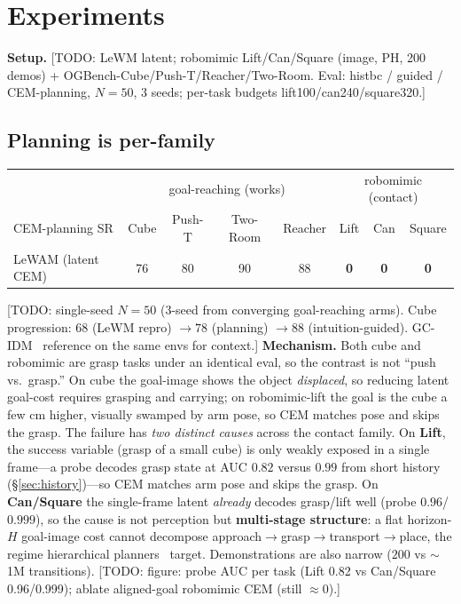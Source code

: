 \documentclass[11pt]{article}
\newcommand{\todo}[1]{{\color{red}[TODO: #1]}}
\begin{document}
\section{Experiments}
\textbf{Setup.} \todo{LeWM latent; robomimic Lift/Can/Square (image, PH, 200 demos) + OGBench-Cube/Push-T/Reacher/Two-Room. Eval: histbc / guided / CEM-planning, $N{=}50$, 3 seeds; per-task budgets lift100/can240/square320.}

\subsection{Planning is per-family}\label{sec:perfamily}
\begin{center}\footnotesize\setlength{\tabcolsep}{4pt}
\begin{tabular}{@{}lcccc|ccc@{}}
\toprule
& \multicolumn{4}{c|}{goal-reaching (works)} & \multicolumn{3}{c}{robomimic (contact)} \\
CEM-planning SR & Cube & Push-T & Two-Room & Reacher & Lift & Can & Square \\
\midrule
LeWAM (latent CEM) & 76 & 80 & 90 & 88 & \textbf{0} & \textbf{0} & \textbf{0} \\
\bottomrule
\end{tabular}
\end{center}
\todo{single-seed $N{=}50$ (3-seed from converging goal-reaching arms). Cube progression: $68$ (LeWM repro) $\to 78$ (planning) $\to 88$ (intuition-guided). GC-IDM~\cite{gcidm} reference on the same envs for context.}
\textbf{Mechanism.} Both cube and robomimic are grasp tasks under an identical eval, so the contrast is not ``push vs.\ grasp.'' On cube the goal-image shows the object \emph{displaced}, so reducing latent goal-cost requires grasping and carrying; on robomimic-lift the goal is the cube a few cm higher, visually swamped by arm pose, so CEM matches pose and skips the grasp. The failure has \emph{two distinct causes} across the contact family. On \textbf{Lift}, the success variable (grasp of a small cube) is only weakly exposed in a single frame---a probe decodes grasp state at AUC $0.82$ versus $0.99$ from short history (\S\ref{sec:history})---so CEM matches arm pose and skips the grasp. On \textbf{Can/Square} the single-frame latent \emph{already} decodes grasp/lift well (probe $0.96$/$0.999$), so the cause is not perception but \textbf{multi-stage structure}: a flat horizon-$H$ goal-image cost cannot decompose approach$\to$grasp$\to$transport$\to$place, the regime hierarchical planners~\cite{worlddp} target. Demonstrations are also narrow ($200$ vs $\sim$1M transitions). \todo{figure: probe AUC per task (Lift 0.82 vs Can/Square 0.96/0.999); ablate aligned-goal robomimic CEM (still $\approx 0$).}
\end{document}
